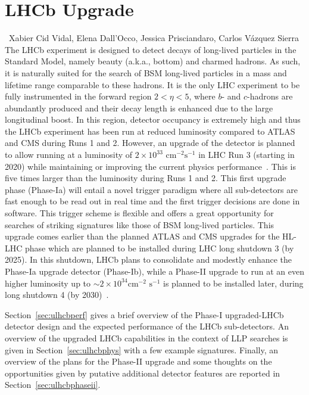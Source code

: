 \section{LHCb Upgrade}\label{sec:LHCb_upgrade}

~Xabier Cid Vidal, Elena Dall'Occo, Jessica Prisciandaro, Carlos V\'azquez Sierra \\

The LHCb experiment is designed to detect decays of long-lived particles in the Standard Model, namely beauty (a.k.a., bottom) and charmed hadrons. As such, it is naturally suited for the search of BSM long-lived particles in a mass and lifetime range comparable to these hadrons. It is the only LHC experiment to be fully instrumented in the forward region $2<\eta<5$, where $b$- and $c$-hadrons are abundantly produced and their decay length is enhanced due to the large longitudinal boost. In this
region, detector occupancy is extremely high and thus the LHCb experiment has been run at reduced luminosity compared to ATLAS and CMS during Runs 1 and 2. However, an upgrade of the detector is planned to allow running at a luminosity of $2\times 10^{33}\,\,\text{cm}^{-2}\text{s}^{-1}$ in LHC Run 3 (starting in 2020) while maintaining or improving the current physics performance~\cite{LHCbUpgradeTDR}. This is five times larger than the luminosity during Runs 1 and 2. This first upgrade phase (Phase-Ia) will entail a novel trigger paradigm where all sub-detectors are fast enough to be read out in real time and the first trigger decisions are done in software. This trigger scheme is flexible and offers a great opportunity for searches of striking signatures like those of BSM long-lived particles. This upgrade comes earlier than the planned ATLAS and CMS upgrades for the HL-LHC phase which are planned to be installed during LHC long shutdown 3 (by 2025). In this shutdown, LHCb plans to consolidate and modestly enhance the Phase-Ia upgrade detector (Phase-Ib), while a Phase-II upgrade to run at an even higher luminosity up to $\sim 2\times 10^{34}\text{cm}^{-2}\,\,\text{s}^{-1}$ is planned to be installed later, during long shutdown 4 (by 2030)~\cite{LHCbUpgradeIIPC}.

Section~\ref{sec:ulhcbperf} gives a brief overview of the Phase-I upgraded-LHCb detector design and the expected performance of the LHCb sub-detectors. An overview of the upgraded LHCb capabilities in the context of LLP searches is given in Section~\ref{sec:ulhcbphys} with a few example signatures. Finally, an overview of the plans for the Phase-II upgrade and some thoughts on the opportunities given by putative additional detector features are reported in Section~\ref{sec:ulhcbphaseii}.

